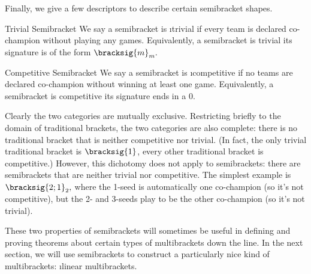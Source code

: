 {    

    Finally, we give a few descriptors to describe certain semibracket shapes.

    \begin{definition}{Trivial Semibracket}{}
        We say a semibracket is \i{trivial} if every team is declared co-champion without playing any games. Equivalently, a semibracket is trivial its signature is of the form $\bracksig{m}_m.$
    \end{definition}

    \begin{definition}{Competitive Semibracket}{}
        We say a semibracket is \i{competitive} if no teams are declared co-champion without winning at least one game. Equivalently, a semibracket is competitive its signature ends in a $0.$
    \end{definition}

    Clearly the two categories are mutually exclusive. Restricting briefly to the domain of traditional brackets, the two categories are also complete: there is no traditional bracket that is neither competitive nor trivial. (In fact, the only trivial traditional bracket is $\bracksig{1}$, every other traditional bracket is competitive.) However, this dichotomy does not apply to semibrackets: there are semibrackets that are neither trivial nor competitive. The simplest example is $\bracksig{2;1}_2,$ where the 1-seed is automatically one co-champion (so it's not competitive), but the 2- and 3-seeds play to be the other co-champion (so it's not trivial).


    These two properties of semibrackets will sometimes be useful in defining and proving theorems about certain types of multibrackets down the line. In the next section, we will use semibrackets to construct a particularly nice kind of multibrackets: \i{linear multibrackets.}
}







